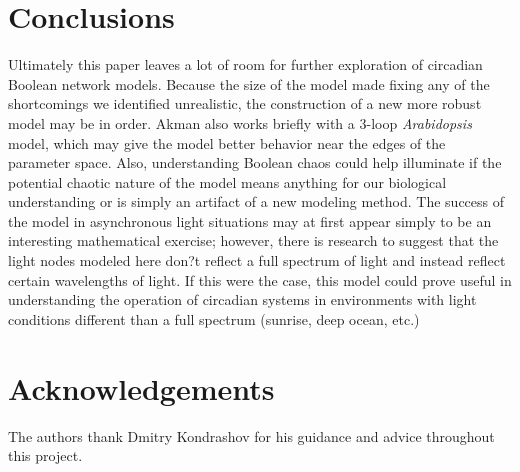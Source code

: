 \documentclass[twoside,twocolumn,9pt]{article}
\begin{document}
\section{Conclusions}
Ultimately this paper leaves a lot of room for further exploration of circadian Boolean network models. Because the size of the model made fixing any of the shortcomings we identified unrealistic, the construction of a new more robust model may be in order. Akman also works briefly with a 3-loop \textit{Arabidopsis} model, which may give the model better behavior near the edges of the parameter space. Also, understanding Boolean chaos could help illuminate if the potential chaotic nature of the model means anything for our biological understanding or is simply an artifact of a new modeling method. The success of the model in asynchronous light situations may at first appear simply to be an interesting mathematical exercise; however, there is research to suggest that the light nodes modeled here don?t reflect a full spectrum of light and instead reflect certain wavelengths of light\cite{colors}. If this were the case, this model could prove useful in understanding the operation of circadian systems in environments with light conditions different than a full spectrum (sunrise, deep ocean, etc.)


\section{Acknowledgements}

The authors thank Dmitry Kondrashov for his guidance and advice throughout this project.






\end{document}
